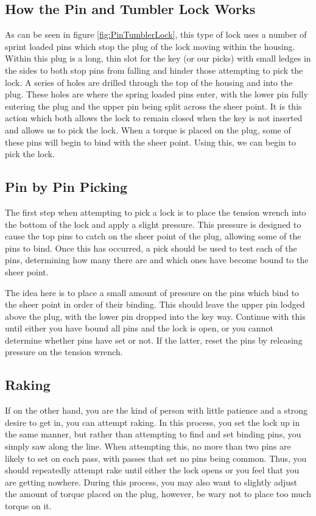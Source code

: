 		\subsection{How the Pin and Tumbler Lock Works}
			As can be seen in figure \ref{fig:PinTumblerLock}, this type of lock uses a number of sprint loaded pins which stop the plug of the lock moving within the housing. 
			Within this plug is a long, thin slot for the key (or our picks) with small ledges in the sides to both stop pins from falling and hinder those attempting to pick the lock. 
			A series of holes are drilled through the top of the housing and into the plug. 
			These holes are where the spring loaded pins enter, with the lower pin fully entering the plug and the upper pin being split across the sheer point. 
			It is this action which both allows the lock to remain closed when the key is not inserted and allows us to pick the lock. 
			When a torque is placed on the plug, some of these pins will begin to bind with the sheer point. 
			Using this, we can begin to pick the lock. 

		\subsection{Pin by Pin Picking}
			The first step when attempting to pick a lock is to place the tension wrench into the bottom of the lock and apply a slight pressure. 
			This pressure is designed to cause the top pins to catch on the sheer point of the plug, allowing some of the pins to bind. 
			Once this has occurred, a pick should be used to test each of the pins, determining how many there are and which ones have become bound to the sheer point. 

			The idea here is to place a small amount of pressure on the pins which bind to the sheer point in order of their binding. 
			This should leave the upper pin lodged above the plug, with the lower pin dropped into the key way. 
			Continue with this until either you have bound all pins and the lock is open, or you cannot determine whether pins have set or not. 
			If the latter, reset the pins by releasing pressure on the tension wrench. 
		\subsection{Raking}
			If on the other hand, you are the kind of person with little patience and a strong desire to get in, you can attempt raking. 
			In this process, you set the lock up in the same manner, but rather than attempting to find and set binding pins, you simply saw along the line. 
			When attempting this, no more than two pins are likely to set on each pass, with passes that set no pins being common. 
			Thus, you should repeatedly attempt rake until either the lock opens or you feel that you are getting nowhere. 
			During this process, you may also want to slightly adjust the amount of torque placed on the plug, however, be wary not to place too much torque on it. 

